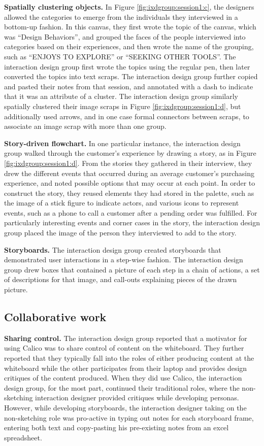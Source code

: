 \documentclass[12pt,fleqn]{ucithesis}
\begin{document}
\textbf{Spatially clustering objects.} In Figure \ref{fig:ixdgroup:session1:c}, the designers allowed the categories to emerge from the individuals they interviewed in a bottom-up fashion. In this canvas, they first wrote the topic of the canvas, which was ``Design Behaviors'', and grouped the faces of the people interviewed into categories based on their experiences, and then wrote the name of the grouping, such as ``ENJOYS TO EXPLORE'' or ``SEEKING OTHER TOOLS''. The interaction design group first wrote the topics using the regular pen, then later converted the topics into text scraps. The interaction design group further copied and pasted their notes from that session, and annotated with a dash to indicate that it was an attribute of a cluster. The interaction design group similarly spatially clustered their image scraps in Figure \ref{fig:ixdgroup:session1:d}, but additionally used arrows, and in one case formal connectors between scraps, to associate an image scrap with more than one group.

\textbf{Story-driven flowchart. } In one particular instance, the interaction design group walked through the customer's experience by drawing a story, as in Figure \ref{fig:ixdgroup:session1:d}. From the stories they gathered in their interview, they drew the different events that occurred during an average customer's purchasing experience, and noted possible options that may occur at each point. In order to construct the story, they reused elements they had stored in the palette, such as the image of a stick figure to indicate actors, and various icons to represent events, such as a phone to call a customer after a pending order was fulfilled. For particularly interesting events and corner cases in the story, the interaction design group placed the image of the person they interviewed to add to the story. 

\textbf{Storyboards.} The interaction design group created storyboards that demonstrated user interactions in a step-wise fashion. The interaction design group drew boxes that contained a picture of each step in a chain of actions, a set of descriptions for that image, and call-outs explaining pieces of the drawn picture.

\subsection{Collaborative work}

\textbf{Sharing control.} The interaction design group reported that a motivator for using Calico was to share control of content on the whiteboard. They further reported that they typically fall into the roles of either producing content at the whiteboard while the other participates from their laptop and provides design critiques of the content produced. When they did use Calico, the interaction design group, for the most part, continued their traditional roles, where the non-sketching interaction designer provided critiques while developing personas. However, while developing storyboards, the interaction designer taking on the non-sketching role was pro-active in typing out notes for each storyboard frame, entering both text and copy-pasting his pre-existing notes from an excel spreadsheet.
\end{document}
